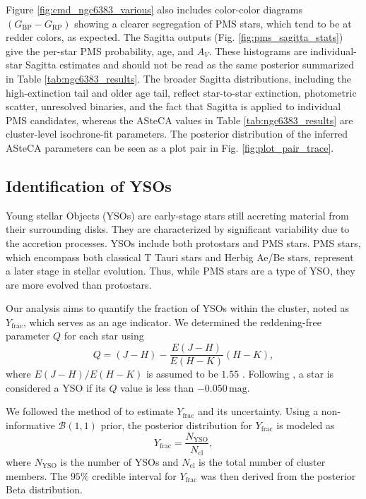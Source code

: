 \documentclass{aa}
\begin{document}
Figure \ref{fig:cmd_ngc6383_various} also includes color-color diagrams $(G_\mathrm{BP} - G_\mathrm{RP})$ showing a clearer segregation of PMS stars, which tend to be at redder colors, as expected. The Sagitta outputs (Fig. \ref{fig:pms_sagitta_stats}) give the per-star PMS probability, age, and $A_V$. These histograms are individual-star Sagitta estimates and should not be read as the same posterior summarized in Table \ref{tab:ngc6383_results}. The broader Sagitta distributions, including the high-extinction tail and older age tail, reflect star-to-star extinction, photometric scatter, unresolved binaries, and the fact that Sagitta is applied to individual PMS candidates, whereas the ASteCA values in Table \ref{tab:ngc6383_results} are cluster-level isochrone-fit parameters. The posterior distribution of the inferred ASteCA parameters can be seen as a plot pair in Fig. \ref{fig:plot_pair_trace}.
\subsection{Identification of YSOs}

Young stellar Objects (YSOs) are early-stage stars still accreting material from their surrounding disks. They are characterized by significant variability due to the accretion processes. YSOs include both protostars and PMS stars. PMS stars, which encompass both classical T Tauri stars and Herbig Ae/Be stars, represent a later stage in stellar evolution. Thus, while PMS stars are a type of YSO, they are more evolved than protostars.

Our analysis aims to quantify the fraction of YSOs within the cluster, noted as $ Y_{\text{frac}} $, which serves as an age indicator. We determined the reddening-free parameter $ Q $ for each star using
\begin{equation}
	Q = (J - H) - \frac{E(J-H)}{E(H - K)} (H-K),
\end{equation}
where $ E(J-H)/E(H-K) $ is assumed to be $1.55$ \citep{1990ARA&A..28...37M}. Following \citet{2013MNRAS.436.1465B}, a star is considered a YSO if its $ Q $ value is less than $-0.050\,\mathrm{mag}$.

We followed the method of \citet{2011PASA...28..128C} to estimate $ Y_{\text{frac}} $ and its uncertainty. Using a non-informative $\mathcal{B}(1, 1)$ prior, the posterior distribution for $ Y_{\text{frac}} $ is modeled as
\begin{equation}
	Y_{\text{frac}} = \frac{N_{\text{YSO}}}{N_{\text{cl}}},
\end{equation}
where $ N_{\text{YSO}} $ is the number of YSOs and $ N_{\text{cl}} $ is the total number of cluster members. The $95\%$ credible interval for $ Y_{\text{frac}} $ was then derived from the posterior Beta distribution.
\end{document}
